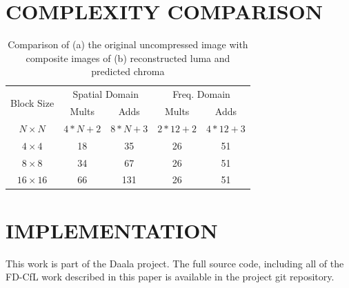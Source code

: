 \documentclass[a4paper]{spie}  %
\begin{document}
\section{COMPLEXITY COMPARISON}

\begin{table}
\begin{center}
\begin{tabular}{|c|c|c|c|c|}
\hline
\multirow{2}{*}{Block Size} & \multicolumn{2}{|c|}{Spatial Domain} & \multicolumn{2}{|c|}{Freq. Domain} \\
\cline{2-5}
 & Mults & Adds & Mults & Adds \\
\hline
$N\times N$ & $4*N+2$ & $8*N+3$ & $2*12+2$ & $4*12+3$ \\
\hline
$4\times 4$ & 18 & 35 & 26 & 51 \\
\hline
$8\times 8$ & 34 & 67 & 26 & 51 \\
\hline
$16\times 16$\footnotemark[1] & 66 & 131 & 26 & 51 \\
\hline
\end{tabular}
\end{center}
\caption[example]{\label{tbl:comp} Comparison of (a) the original uncompressed
 image with composite images of (b) reconstructed luma and predicted chroma}
\end{table}

\section{IMPLEMENTATION}

This work is part of the Daala project\cite{DaalaWebsite}.
The full source code, including all of the FD-CfL work described in this paper
 is available in the project git repository\cite{DaalaGit}.



\end{document}
